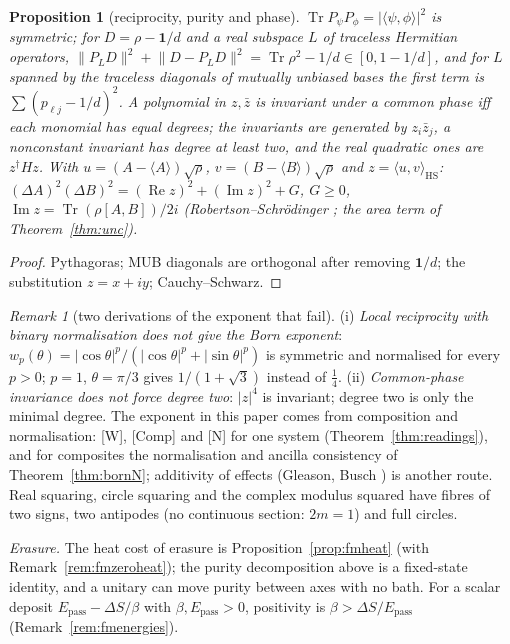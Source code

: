 \documentclass[aps,pra,onecolumn,superscriptaddress,nofootinbib,10pt]{revtex4-2}
\newtheorem{proposition}[theorem]{Proposition}
\theoremstyle{definition}
\theoremstyle{remark}
\newtheorem{remark}[theorem]{Remark}
\newcommand{\re}{\operatorname{Re}}
\newcommand{\im}{\operatorname{Im}}
\newcommand{\tr}{\operatorname{Tr}}
\newcommand{\ip}[2]{\langle #1,#2\rangle}
\begin{document}
\begin{proposition}[reciprocity, purity and phase]\label{prop:bdpurity}
$\tr P_\psi P_\phi=\lvert\ip\psi\phi\rvert^2$ is symmetric; for $D=\rho-\mathbf1/d$ and a real subspace $L$ of traceless Hermitian operators, $\lVert P_LD\rVert^2+\lVert D-P_LD\rVert^2=\tr\rho^2-1/d\in[0,1-1/d]$,
and for $L$ spanned by the traceless diagonals of mutually unbiased bases the first term is $\sum(p_{\ell j}-1/d)^2$.  A polynomial in
$z,\bar z$ is invariant under a common phase iff each monomial has equal degrees; the invariants are generated by
$z_i\bar z_j$, a nonconstant invariant has degree at least two, and the real quadratic ones are $z^\dagger Hz$.  With $u=(A-\langle A\rangle)\sqrt\rho$,
$v=(B-\langle B\rangle)\sqrt\rho$ and $z=\ip uv_{\mathrm{HS}}$: $(\Delta A)^2(\Delta B)^2=(\re z)^2+(\im z)^2+G$, $G\ge0$, $\im z=\tr(\rho[A,B])/2i$ (Robertson--Schr\"odinger
\cite{Robertson,Schrodinger30}; the area term of Theorem~\ref{thm:unc}).
\end{proposition}
\begin{proof}
Pythagoras; MUB diagonals are orthogonal after removing $\mathbf1/d$; the substitution $z=x+iy$; Cauchy--Schwarz.
\end{proof}

\begin{remark}[two derivations of the exponent that fail]\label{rem:bdexponent}
(i) \emph{Local reciprocity with binary normalisation does not give the Born exponent}: $w_p(\theta)=\lvert\cos\theta\rvert^p/(\lvert\cos\theta\rvert^p+\lvert\sin\theta\rvert^p)$ is
symmetric and normalised for every $p>0$; $p=1$, $\theta=\pi/3$ gives $1/(1+\sqrt3)$ instead of $\tfrac14$.  (ii) \emph{Common-phase invariance does
not force degree two}: $\lvert z\rvert^4$ is invariant; degree two is only the minimal degree.  The exponent in this paper comes
from composition and normalisation: [W], [Comp] and [N] for one system (Theorem~\ref{thm:readings}), and for
composites the normalisation and ancilla consistency of Theorem~\ref{thm:bornN}; additivity of effects
(Gleason, Busch \cite{Gleason57,Busch03}) is another route.  Real squaring, circle squaring and the complex
modulus squared have fibres of two signs, two antipodes (no continuous section: $2m=1$) and full circles.
\end{remark}

\noindent\emph{Erasure.}  The heat cost of erasure is Proposition~\ref{prop:fmheat} (with Remark~\ref{rem:fmzeroheat});
the purity decomposition above is a fixed-state identity, and a unitary can move purity between axes with
no bath.  For a scalar deposit $E_{\mathrm{pass}}-\Delta S/\beta$ with $\beta,E_{\mathrm{pass}}>0$, positivity is $\beta>\Delta S/E_{\mathrm{pass}}$ (Remark~\ref{rem:fmenergies}).
\end{document}
